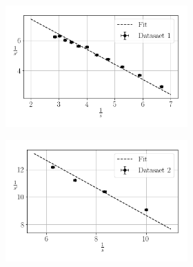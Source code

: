 \begin{table}[H]
\begin{figure}[H]
\begin{figure}[H]
\begin{figure}[H]
    \includegraphics[width=\linewidth]{1.png}
    \caption{}
    \label{fig:1}
\end{figure}
\begin{figure}[H]
    \includegraphics[width=\linewidth]{2.png}
    \caption{}
    \label{fig:2}
\end{figure}


\end{figure}
\end{figure}
\end{table}
